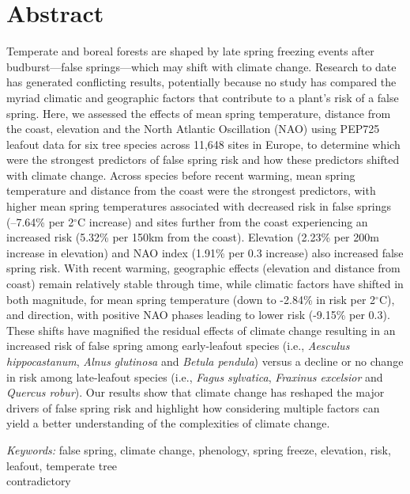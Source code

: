 \documentclass{article}\usepackage[]{graphicx}\usepackage[]{color}
\begin{document}
\section*{Abstract} %
Temperate and boreal forests are shaped by late spring freezing events after budburst---false springs---which may shift with climate change. Research to date has generated conflicting results, potentially because no study has compared the myriad climatic and geographic factors that contribute to a plant's risk of a false spring. Here, we assessed the effects of mean spring temperature, distance from the coast, elevation and the North Atlantic Oscillation (NAO) using PEP725 leafout data for six tree species across 11,648 sites in Europe, to determine which were the strongest predictors of false spring risk and how these predictors shifted with climate change. Across species before recent warming, mean spring temperature and distance from the coast were the strongest predictors, with higher mean spring temperatures associated with decreased risk in false springs (--7.64\% per 2$^{\circ}$C increase) and sites further from the coast experiencing an increased risk (5.32\% per 150km from the coast). Elevation (2.23\% per 200m increase in elevation) and NAO index (1.91\% per 0.3 increase) also increased false spring risk. With recent warming, geographic effects (elevation and distance from coast) remain relatively stable through time, while climatic factors have shifted in both magnitude, for mean spring temperature (down to -2.84\% in risk per 2$^{\circ}$C), and direction, with positive NAO phases leading to lower risk (-9.15\% per 0.3). These shifts have magnified the residual effects of climate change resulting in an increased risk of false spring among early-leafout species (i.e., \textit{Aesculus hippocastanum}, \textit{Alnus glutinosa} and \textit{Betula pendula}) versus a decline or no change in risk among late-leafout species (i.e., \textit{Fagus sylvatica}, \textit{Fraxinus excelsior} and \textit{Quercus robur}). Our results show that climate change has reshaped the major drivers of false spring risk and highlight how considering multiple factors can yield a better understanding of the complexities of climate change.

\vspace{2ex}
\textit{Keywords:} false spring, climate change, phenology, spring freeze, elevation, risk, leafout, temperate tree \\contradictory

\end{document}
